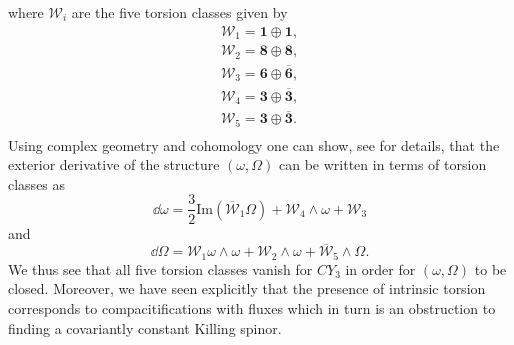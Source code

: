 where $\mathscr{W}_i$ are the five torsion classes given by 
\begin{align*}
    \mathscr{W}_1 = \mathbf{1}\oplus\mathbf{1},\\
    \mathscr{W}_2 = \mathbf{8}\oplus\mathbf{8},\\
    \mathscr{W}_3 = \mathbf{6}\oplus\overbar{\mathbf{6}},\\
    \mathscr{W}_4 = \mathbf{3}\oplus\overbar{\mathbf{3}},\\
    \mathscr{W}_5 = \mathbf{3}\oplus\overbar{\mathbf{3}}.\\
\end{align*}
Using complex geometry and cohomology one can show, see \cite{Blumenhagen2013} for details, that the exterior derivative of the structure $(\omega,\Omega)$ can be written in terms of torsion classes as 
\begin{equation}
    \dd \omega = \frac{3}{2}\text{Im}(\overbar{\mathscr{W}}_1\Omega)+\mathscr{W}_4\wedge \omega+\mathscr{W}_3
\end{equation}
and 
\begin{equation}
    \dd \Omega = \mathscr{W}_1\omega\wedge\omega+\mathscr{W}_2\wedge\omega+\overbar{\mathscr{W}}_5\wedge\Omega.
\end{equation}
We thus see that all five torsion classes vanish for $CY_3$ in order for $(\omega,\Omega)$ to be closed. Moreover, we have seen explicitly that the presence of intrinsic torsion corresponds to compacitifications with fluxes which in turn is an obstruction to finding a covariantly constant Killing spinor.


